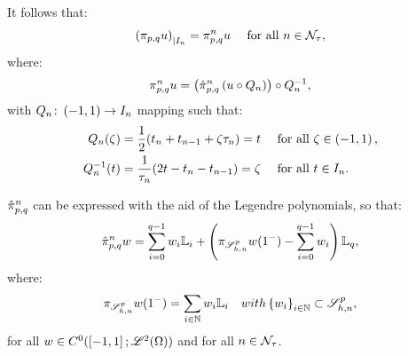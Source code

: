 It follows that:
\begin{gather}
    \left( \pi_{p, q} u \right)_{\mid I_n} = \pi_{p, q}^n u \quad \text{ for all } n \in \mathcal{N}_{\tau},
\end{gather}
where:
\begin{gather}
    \pi_{p, q}^n u = \left( \hat{\pi}_{p, q}^n \left( u \circ Q_n \right) \right) \circ Q_n^{-1},
\end{gather}
with $Q_n \colon \left( -1, 1 \right) \rightarrow I_n$ mapping such that:
\begin{align}
    Q_n(\zeta) &= \frac{1}{2}(t_n + t_{n - 1} + \zeta \tau_n) = t \quad \text{ for all } \zeta \in \left( -1, 1 \right), \\
    Q_n^{-1}(t) &= \frac{1}{\tau_n}(2t - t_n - t_{n - 1}) = \zeta \quad \text{ for all } t \in I_n.
\end{align}

\begin{lemma}
    $\hat{\pi}_{p, q}^n$ can be expressed with the aid of the Legendre polynomials, so that:
    \begin{gather}
        \hat{\pi}_{p, q}^n w = \sum_{i = 0}^{q - 1} w_i \mathbb{L}_i + \left( \pi_{\mathscr{S}^p_{h, n}} w(1^-) - \sum_{i = 0}^{q - 1} w_i \right) \mathbb{L}_q,
    \end{gather}
    where:
    \begin{gather}
        \pi_{\mathscr{S}^p_{h, n}} w(1^-) = \sum_{i \in \mathbb{N}} w_i \mathbb{L}_i \quad{ with } \left\{ w_i \right\}_{i \in \mathbb{N}} \subset \mathscr{S}^p_{h, n},
    \end{gather}
    for all $w \in C^0(\left[ -1, 1 \right]; \mathscr{L}^{2}(\Omega))$ and for all $n \in \mathcal{N}_{\tau}$. 
\end{lemma}